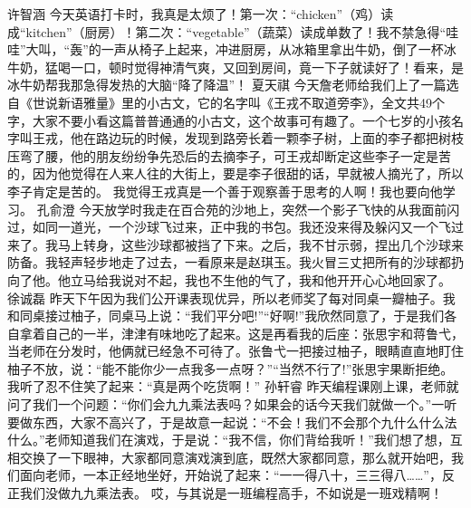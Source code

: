 {}\markdownRendererInterblockSeparator
{}许智涵\markdownRendererInterblockSeparator
{}今天英语打卡时，我真是太烦了！第一次：“chicken”（鸡）读成“kitchen”（厨房）！第二次：“vegetable”（蔬菜）读成单数了！我不禁急得“哇哇”大叫，“轰”的一声从椅子上起来，冲进厨房，从冰箱里拿出牛奶，倒了一杯冰牛奶，猛喝一口，顿时觉得神清气爽，又回到房间，竟一下子就读好了！看来，是冰牛奶帮我那急得发热的大脑“降了降温”！ \markdownRendererInterblockSeparator
{}\markdownRendererInterblockSeparator
{}夏天祺\markdownRendererInterblockSeparator
{}今天詹老师给我们上了一篇选自《世说新语雅量》里的小古文，它的名字叫《王戎不取道旁李》，全文共49个字，大家不要小看这篇普普通通的小古文，这个故事可有趣了。一个七岁的小孩名字叫王戎，他在路边玩的时候，发现到路旁长着一颗李子树，上面的李子都把树枝压弯了腰，他的朋友纷纷争先恐后的去摘李子，可王戎却断定这些李子一定是苦的，因为他觉得在人来人往的大街上，要是李子很甜的话，早就被人摘光了，所以李子肯定是苦的。\markdownRendererInterblockSeparator
{}我觉得王戎真是一个善于观察善于思考的人啊！我也要向他学习。\markdownRendererInterblockSeparator
{}\markdownRendererInterblockSeparator
{}孔俞澄\markdownRendererInterblockSeparator
{}今天放学时我走在百合苑的沙地上，突然一个影子飞快的从我面前闪过，如同一道光，一个沙球飞过来，正中我的书包。我还没来得及躲闪又一个飞过来了。我马上转身，这些沙球都被挡了下来。之后，我不甘示弱，捏出几个沙球来防备。我轻声轻步地走了过去，一看原来是赵琪玉。我火冒三丈把所有的沙球都扔向了他。他立马给我说对不起，我也不生他的气了，我和他开开心心地回家了。\markdownRendererInterblockSeparator
{}\markdownRendererInterblockSeparator
{}徐诚磊\markdownRendererInterblockSeparator
{}昨天下午因为我们公开课表现优异，所以老师奖了每对同桌一瓣柚子。我和同桌接过柚子，同桌马上说：“我们平分吧!”“好啊!”我欣然同意了，于是我们各自拿着自己的一半，津津有味地吃了起来。这是再看我的后座：张思宇和蒋鲁弋，当老师在分发时，他俩就已经急不可待了。张鲁弋一把接过柚子，眼睛直直地盯住柚子不放，说：“能不能你少一点我多一点呀？”“当然不行了!”张思宇果断拒绝。我听了忍不住笑了起来：“真是两个吃货啊！”\markdownRendererInterblockSeparator
{}\markdownRendererInterblockSeparator
{}孙轩睿\markdownRendererInterblockSeparator
{}昨天编程课刚上课，老师就问了我们一个问题：“你们会九九乘法表吗？如果会的话今天我们就做一个。”一听要做东西，大家不高兴了，于是故意一起说：“不会！我们不会那个九什么什么法什么。”老师知道我们在演戏，于是说：“我不信，你们背给我听！”我们想了想，互相交换了一下眼神，大家都同意演戏演到底，既然大家都同意，那么就开始吧，我们面向老师，一本正经地坐好，开始说了起来：“一一得八十，三三得八……”，反正我们没做九九乘法表。 哎，与其说是一班编程高手，不如说是一班戏精啊！\markdownRendererInterblockSeparator
